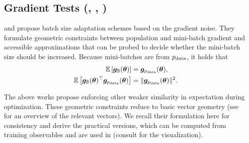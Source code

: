 \subsection{Gradient Tests (,
  ,
  )}\label{cockpit::app:gradient_tests}

\citet{bollapragada2017adaptive} and \citet{byrd2012sample} propose batch size adaptation
schemes based on the gradient noise. They formulate geometric constraints
between population and mini-batch gradient and accessible approximations that
can be probed to decide whether the mini-batch size should be increased. Because
mini-batches are \iid from $p_{\mathrm{data}}$, it holds that
\begin{subequations}
  \label{cockpit::eq:iid-sampling-expectation}
  \begin{align}
    \mathbb{E}\left[{\bm{g}}_{{\mathbb{B}}}({\bm{\theta}}) \right]
    &=
      {\bm{g}}_{p_{\mathrm{data}}}({\bm{\theta}}),
    \\
    \mathbb{E}\left[ {\bm{g}}_{{\mathbb{B}}}({\bm{\theta}})^\top {\bm{g}}_{p_{\mathrm{data}}}({\bm{\theta}})  \right]
    &=
      \lVert {\bm{g}}_{p_{\mathrm{data}}}({\bm{\theta}})  \rVert^2.
  \end{align}
\end{subequations}

The above works propose enforcing other weaker similarity in expectation during
optimization. These geometric constraints reduce to basic vector geometry (see
 for an overview of the relevant
vectors). We recall their formulation here for consistency and derive the
practical versions, which can be computed from training observables and are used
in \cockpit (consult  for the
visualization).

